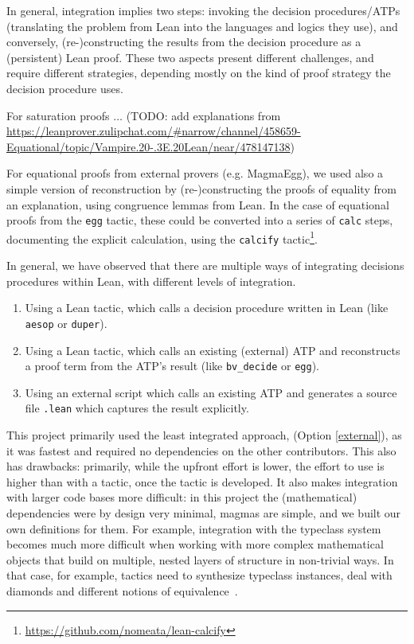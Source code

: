 In general, integration implies two steps: invoking the decision procedures/ATPs (translating the problem from Lean into the languages and logics they use), and conversely, (re-)constructing the results from the decision procedure as a (persistent) Lean proof.
These two aspects present different challenges, and require different strategies, depending mostly on the kind of proof strategy the decision procedure uses.

For saturation proofs $\ldots$ (TODO: add explanations from \url{https://leanprover.zulipchat.com/#narrow/channel/458659-Equational/topic/Vampire.20-.3E.20Lean/near/478147138})

For equational proofs from external provers (e.g. MagmaEgg), we used also a simple version of reconstruction by (re-)constructing the proofs of equality from an explanation, using congruence lemmas from Lean.
In the case of equational proofs from the \texttt{egg} tactic, these could be converted into a series of \texttt{calc} steps, documenting the explicit calculation, using the \texttt{calcify} tactic\footnote{\url{https://github.com/nomeata/lean-calcify}}.

In general, we have observed that there are multiple ways of integrating decisions procedures within Lean, with different levels of integration.
\begin{enumerate}
    \item Using a Lean tactic, which calls a decision procedure written in Lean (like \texttt{aesop} or \texttt{duper}).
    \item Using a Lean tactic, which calls an existing (external) ATP and reconstructs a proof term from the ATP's result (like \texttt{bv\_decide} or \texttt{egg}).
    \item\label{external} Using an external script which calls an existing ATP and generates a source file \texttt{.lean} which captures the result explicitly.
\end{enumerate}

This project primarily used the least integrated approach, (Option \ref{external}), as it was fastest and required no dependencies on the other contributors.
This also has drawbacks: primarily, while the upfront effort is lower, the effort to use is higher than with a tactic, once the tactic is developed.
It also makes integration with larger code bases more difficult: in this project the (mathematical) dependencies were by design very minimal, magmas are simple, and we built our own definitions for them.
For example, integration with the typeclass system becomes much more difficult when working with more complex mathematical objects that build on multiple, nested layers of structure in non-trivial ways.
In that case, for example, tactics need to synthesize typeclass instances, deal with diamonds and different notions of equivalence~\cite{DBLP:conf/mkm/Wieser23}.


